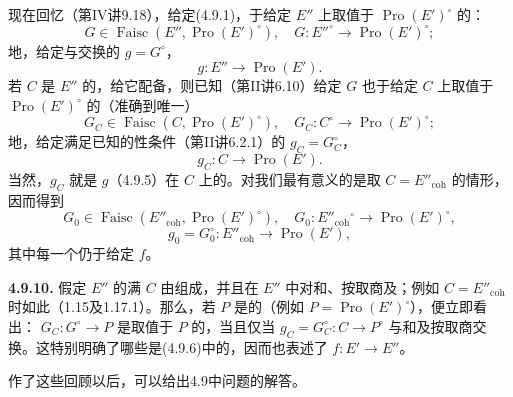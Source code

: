现在回忆（第IV讲9.18），给定(4.9.1)，于给定 $E''$ 上取值于 $\operatorname{Pro}(E')^{\circ}$ 的：
\[
G\in\operatorname{Faisc}(E'',\operatorname{Pro}(E')^{\circ}),\quad
G:E''^{\circ}\longrightarrow\operatorname{Pro}(E')^{\circ};\tag{4.9.4}
\]
地，给定与交换的 $g=G^{\circ}$，
\[
g:E''\longrightarrow\operatorname{Pro}(E').\tag{4.9.5}
\]
若 $C$ 是 $E''$ 的，给它配备，则已知（第II讲6.10）给定 $G$ 也于给定 $C$ 上取值于 $\operatorname{Pro}(E')^{\circ}$ 的（准确到唯一）
\[
G_C\in\operatorname{Faisc}(C,\operatorname{Pro}(E')^{\circ}),\quad
G_C:C^{\circ}\longrightarrow\operatorname{Pro}(E')^{\circ};\tag{4.9.6}
\]
地，给定满足已知的性条件（第II讲6.2.1）的 $g_C=G_C^{\circ}$，
\[
g_C:C\longrightarrow\operatorname{Pro}(E').\tag{4.9.7}
\]
当然，$g_C$ 就是 $g$（4.9.5）在 $C$ 上的。对我们最有意义的是取 $C=E''_{\mathrm{coh}}$ 的情形，因而得到
\[
G_0\in\operatorname{Faisc}(E''_{\mathrm{coh}},\operatorname{Pro}(E')^{\circ}),\quad
G_0:E''_{\mathrm{coh}}{}^{\circ}\longrightarrow\operatorname{Pro}(E')^{\circ},\tag{4.9.8}
\]
\[
g_0=G_0^{\circ}:E''_{\mathrm{coh}}\longrightarrow\operatorname{Pro}(E'),\tag{4.9.9}
\]
其中每一个仍于给定 $f$。

\textbf{4.9.10.} 假定 $E''$ 的满 $C$ 由组成，并且在 $E''$ 中对和、按取商及；例如 $C=E''_{\mathrm{coh}}$ 时如此（1.15及1.17.1）。那么，若 $P$ 是的（例如 $P=\operatorname{Pro}(E')^{\circ}$），便立即看出： $G_C:G^{\circ}\to P$ 是取值于 $P$ 的，当且仅当 $g_C=G_C^{\circ}:C\to P^{\circ}$ 与和及按取商交换。这特别明确了哪些是(4.9.6)中的，因而也表述了 $f:E'\to E''$。

作了这些回顾以后，可以给出4.9中问题的解答。

